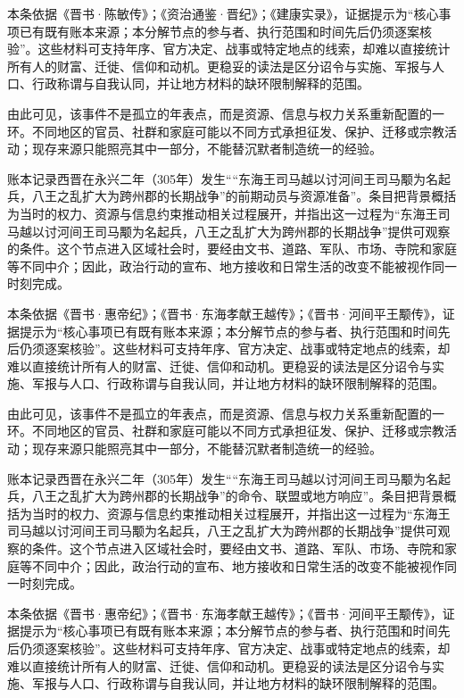 本条依据《晋书·陈敏传》；《资治通鉴·晋纪》；《建康实录》，证据提示为“核心事项已有既有账本来源；本分解节点的参与者、执行范围和时间先后仍须逐案核验”。这些材料可支持年序、官方决定、战事或特定地点的线索，却难以直接统计所有人的财富、迁徙、信仰和动机。更稳妥的读法是区分诏令与实施、军报与人口、行政称谓与自我认同，并让地方材料的缺环限制解释的范围。

由此可见，该事件不是孤立的年表点，而是资源、信息与权力关系重新配置的一环。不同地区的官员、社群和家庭可能以不同方式承担征发、保护、迁移或宗教活动；现存来源只能照亮其中一部分，不能替沉默者制造统一的经验。

账本记录西晋在永兴二年（305年）发生““东海王司马越以讨河间王司马颙为名起兵，八王之乱扩大为跨州郡的长期战争”的前期动员与资源准备”。条目把背景概括为当时的权力、资源与信息约束推动相关过程展开，并指出这一过程为“东海王司马越以讨河间王司马颙为名起兵，八王之乱扩大为跨州郡的长期战争”提供可观察的条件。这个节点进入区域社会时，要经由文书、道路、军队、市场、寺院和家庭等不同中介；因此，政治行动的宣布、地方接收和日常生活的改变不能被视作同一时刻完成。

本条依据《晋书·惠帝纪》；《晋书·东海孝献王越传》；《晋书·河间平王颙传》，证据提示为“核心事项已有既有账本来源；本分解节点的参与者、执行范围和时间先后仍须逐案核验”。这些材料可支持年序、官方决定、战事或特定地点的线索，却难以直接统计所有人的财富、迁徙、信仰和动机。更稳妥的读法是区分诏令与实施、军报与人口、行政称谓与自我认同，并让地方材料的缺环限制解释的范围。

由此可见，该事件不是孤立的年表点，而是资源、信息与权力关系重新配置的一环。不同地区的官员、社群和家庭可能以不同方式承担征发、保护、迁移或宗教活动；现存来源只能照亮其中一部分，不能替沉默者制造统一的经验。

账本记录西晋在永兴二年（305年）发生““东海王司马越以讨河间王司马颙为名起兵，八王之乱扩大为跨州郡的长期战争”的命令、联盟或地方响应”。条目把背景概括为当时的权力、资源与信息约束推动相关过程展开，并指出这一过程为“东海王司马越以讨河间王司马颙为名起兵，八王之乱扩大为跨州郡的长期战争”提供可观察的条件。这个节点进入区域社会时，要经由文书、道路、军队、市场、寺院和家庭等不同中介；因此，政治行动的宣布、地方接收和日常生活的改变不能被视作同一时刻完成。

本条依据《晋书·惠帝纪》；《晋书·东海孝献王越传》；《晋书·河间平王颙传》，证据提示为“核心事项已有既有账本来源；本分解节点的参与者、执行范围和时间先后仍须逐案核验”。这些材料可支持年序、官方决定、战事或特定地点的线索，却难以直接统计所有人的财富、迁徙、信仰和动机。更稳妥的读法是区分诏令与实施、军报与人口、行政称谓与自我认同，并让地方材料的缺环限制解释的范围。

